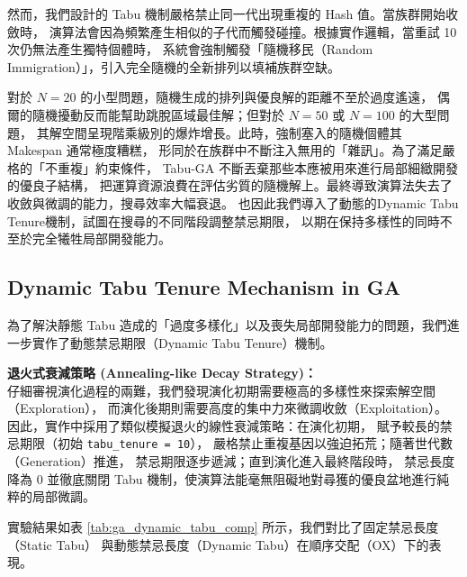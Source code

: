 \documentclass[conference]{IEEEtran}
\begin{document}
然而，我們設計的 Tabu 機制嚴格禁止同一代出現重複的 Hash 值。當族群開始收斂時，
演算法會因為頻繁產生相似的子代而觸發碰撞。根據實作邏輯，當重試 10 次仍無法產生獨特個體時，
系統會強制觸發「隨機移民（Random Immigration）」，引入完全隨機的全新排列以填補族群空缺。

對於 $N=20$ 的小型問題，隨機生成的排列與優良解的距離不至於過度遙遠，
偶爾的隨機擾動反而能幫助跳脫區域最佳解；但對於 $N=50$ 或 $N=100$ 的大型問題，
其解空間呈現階乘級別的爆炸增長。此時，強制塞入的隨機個體其 Makespan 通常極度糟糕，
形同於在族群中不斷注入無用的「雜訊」。為了滿足嚴格的「不重複」約束條件，
Tabu-GA 不斷丟棄那些本應被用來進行局部細緻開發的優良子結構，
把運算資源浪費在評估劣質的隨機解上。最終導致演算法失去了收斂與微調的能力，搜尋效率大幅衰退。
也因此我們導入了動態的Dynamic Tabu Tenure機制，試圖在搜尋的不同階段調整禁忌期限，
以期在保持多樣性的同時不至於完全犧牲局部開發能力。

\subsection{Dynamic Tabu Tenure Mechanism in GA}

為了解決靜態 Tabu 造成的「過度多樣化」以及喪失局部開發能力的問題，我們進一步實作了動態禁忌期限（Dynamic Tabu Tenure）機制。

\textbf{退火式衰減策略 (Annealing-like Decay Strategy)：} \\
仔細審視演化過程的兩難，我們發現演化初期需要極高的多樣性來探索解空間（Exploration），
而演化後期則需要高度的集中力來微調收斂（Exploitation）。
因此，實作中採用了類似模擬退火的線性衰減策略：在演化初期，
賦予較長的禁忌期限（初始 \texttt{tabu\_tenure = 10}），
嚴格禁止重複基因以強迫拓荒；隨著世代數（Generation）推進，
禁忌期限逐步遞減；直到演化進入最終階段時，
禁忌長度降為 0 並徹底關閉 Tabu 機制，使演算法能毫無阻礙地對尋獲的優良盆地進行純粹的局部微調。

實驗結果如表 \ref{tab:ga_dynamic_tabu_comp} 所示，我們對比了固定禁忌長度（Static Tabu）
與動態禁忌長度（Dynamic Tabu）在順序交配（OX）下的表現。
\end{document}
